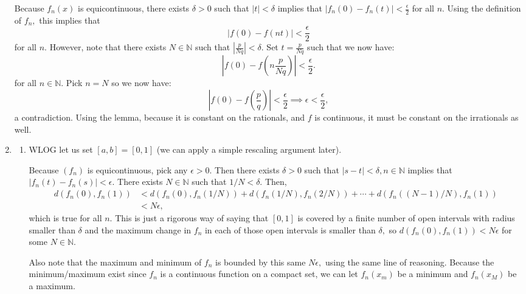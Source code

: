 \documentclass{article}
\numberwithin{equation}{section}
\begin{document}
\begin{enumerate}
    Because $f_n(x)$ is equicontinuous, there exists $\delta > 0$ such that $|t|<\delta$ implies that $|f_n(0)-f_n(t)| < \frac{\epsilon}{2}$ for all $n.$ Using the definition of $f_n,$ this implies that 
    \begin{equation}
        |f(0) - f(nt)| < \frac{\epsilon}{2}
    \end{equation}
    for all $n.$ However, note that there exists $N\in \mathbb{N}$ such that $\left|\frac{p}{Nq}\right| < \delta.$ Set $t=\frac{p}{Nq}$ such that we now have:
    \begin{equation}
        \left|f(0) - f\left(n\frac{p}{Nq}\right)\right| < \frac{\epsilon}{2}.
    \end{equation}
    for all $n\in \mathbb{N}.$ Pick $n=N$ so we now have:
    \begin{equation}
        \left|f(0) - f\left(\frac{p}{q}\right)\right| < \frac{\epsilon}{2} \implies \epsilon < \frac{\epsilon}{2},
    \end{equation}
    a contradiction. Using the lemma, because it is constant on the rationals, and $f$ is continuous, it must be constant on the irrationals as well.

    \newpage 
    \item \begin{enumerate}[label=(\alph*)]
        \item WLOG let us set $[a,b]=[0,1]$ (we can apply a simple rescaling argument later).
        
        Because $(f_n)$ is equicontinuous, pick any $\epsilon > 0.$ Then there exists $\delta > 0$ such that $|s-t|<\delta,n\in \mathbb{N}$ implies that $|f_n(t)-f_n(s)| < \epsilon.$ There exists $N \in \mathbb{N}$ such that $1/N < \delta.$ Then,
        \begin{align}
            d(f_n(0), f_n(1)) &< d(f_n(0), f_n(1/N)) + d(f_n(1/N), f_n(2/N)) + \cdots + d(f_n((N-1)/N), f_n(1)) \\ 
            &< N\epsilon,
        \end{align}
        which is true for all $n.$ This is just a rigorous way of saying that $[0,1]$ is covered by a finite number of open intervals with radius smaller than $\delta$ and the maximum change in $f_n$ in each of those open intervals is smaller than $\delta,$ so $d(f_n(0),f_n(1))< N \epsilon$ for some $N\in \mathbb{N}.$
        
        Also note that the maximum and minimum of $f_n$ is bounded by this same $N\epsilon,$ using the same line of reasoning. Because the minimum/maximum exist since $f_n$ is a continuous function on a compact set, we can let $f_n(x_m)$ be a minimum and $f_n(x_M)$ be a maximum.


\end{enumerate}
\end{enumerate}
\end{document}
